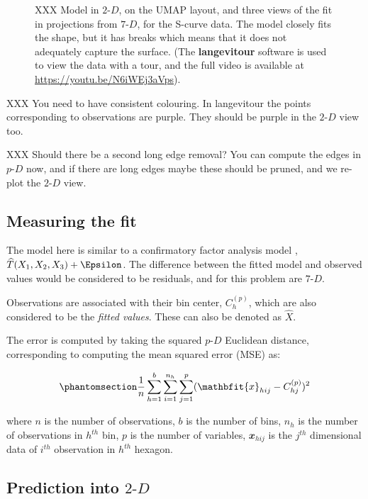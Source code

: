 \documentclass[
  12pt]{article}
\newcommand\pD{$p\text{-}D$}
\newcommand\gD{$2\text{-}D$}
\begin{document}
\begin{figure}[H]
\caption{\label{fig-scurve-sc}XXX Model in \gD{}, on the UMAP layout,
and three views of the fit in projections from \(7\text{-}D\), for the
S-curve data. The model closely fits the shape, but it has breaks which
means that it does not adequately capture the surface. (The
\textbf{langevitour} software is used to view the data with a tour, and
the full video is available at \url{https://youtu.be/N6iWEj3aVps}).}

\end{figure}%

XXX You need to have consistent colouring. In langevitour the points
corresponding to observations are purple. They should be purple in the
\gD{} view too.

XXX Should there be a second long edge removal? You can compute the
edges in \pD{} now, and if there are long edges maybe these should be
pruned, and we re-plot the \gD{} view.

\subsection{Measuring the fit}\label{sec-summary}

The model here is similar to a confirmatory factor analysis model
\citep{brown2015}, \(\widehat{T}(X_1, X_2, X_3) + \Epsilon\). The
difference between the fitted model and observed values would be
considered to be residuals, and for this problem are \(7\text{-}D\).

Observations are associated with their bin center, \(C_{h}^{(p)}\),
which are also considered to be the \emph{fitted values}. These can also
be denoted as \(\widehat{X}\).

The error is computed by taking the squared \pD{} Euclidean distance,
corresponding to computing the mean squared error (MSE) as:

\begin{equation}\phantomsection\label{eq-equation1}{\frac{1}{n}\sum_{h = 1}^{b}\sum_{i = 1}^{n_h}\sum_{j = 1}^{p} (\mathbfit{x}_{hij} - C^{(p)}_{hj})^2}\end{equation}

where \(n\) is the number of observations, \(b\) is the number of bins,
\(n_h\) is the number of observations in \(h^{th}\) bin, \(p\) is the
number of variables, \(\mathbfit{x}_{hij}\) is the \(j^{th}\)
dimensional data of \(i^{th}\) observation in \(h^{th}\) hexagon.

\subsection{\texorpdfstring{Prediction into
\gD{}}{Prediction into }}\label{prediction-into}
\end{document}
